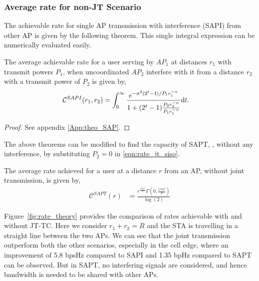 \subsubsection{Average rate for non-JT Scenario}
The achievable rate for single AP transmission with interference (SAPI) from other AP is given by the following theorem. This single integral expression can be numerically evaluated easily. 
\begin{theorem}\label{Theo:SAP_with_interf}
	The average achievable rate for a user serving by $AP_1$ at distances $r_1$ with transmit powers $P_1$, when uncoordinated $AP_2$ interfere with it from a distance $r_2$ with a transmit power of $P_2$ is given by,
	\begin{align}\label{eqn:SAP_rate}
	\mathcal{C}^{SAPI}(r_1,r_2)&=\int_{0}^{\infty}\frac{e^{-\sigma^2(2^t-1)/P_1r_1^{-\alpha}}}{1+(2^t-1)\frac{P_2r_2^{-\alpha}}{P_1 r_1^{-\alpha}}}\mathrm{d} t.
	\end{align}
\end{theorem}
\begin{proof}
	See appendix \ref{App:theo_SAP}.
\end{proof}


The above theorems can be modified to find the capacity of SAPT, \ie, without any interference, by substituting $P_2=0$ in \eqref{eqn:rate_jt_siso}.
\begin{cor}
	The average rate achieved for a user at a distance $r$ from an AP,  without joint transmission, is given by,	
	\begin{align}
	\mathcal{C}^{SAPT}(r)&=\frac{e^{\frac{\sigma ^2 r^{\alpha }}{P}} \Gamma
		\left(0,\frac{r^{\alpha } \sigma ^2}{P}\right)}{\log
		(2)}
	\end{align}
\end{cor}

Figure~\ref{fig:rate_theory} provides the comparison of rates achievable with and without JT-TC. Here we consider $r_1 + r_2 = R$ and the STA is travelling in a straight line between the two APs. We can see that the joint transmission outperform both the other scenarios, especially in the cell edge, where an improvement of 5.8 bpsHz compared to SAPI and 1.35 bpHz compared to SAPT can be observed. But in SAPT, no interfering signals are considered, and hence bandwidth is needed to be shared with other APs. 



